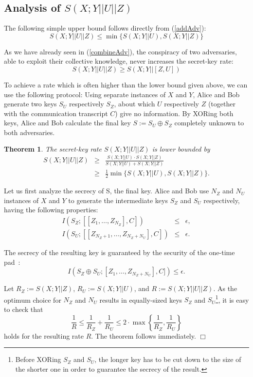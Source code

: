 \documentclass[a4paper, twoside, openany]{report}
\newcommand{\eps}{\epsilon}
\newcommand{\half}{\frac{1}{2}}
\theoremstyle{plain}
\newtheorem{theorem}{Theorem}
\theoremstyle{definition}
\newcommand{\proofend}{\hspace*{\fill} $\Box$\\}
\begin{document}
\subsection{Analysis of $S(X;Y||U||Z)$}

The following simple upper bound follows directly from (\ref{addAdv}):
\[S(X;Y||U||Z) \leq \min\{S(X;Y||U), S(X;Y||Z)\}\]

\noindent
As we have already seen in (\ref{combineAdv}), the conspiracy of two adversaries, able to exploit their collective knowledge, never increases the secret-key rate: 
\[S(X;Y||U||Z) \geq S(X;Y||[Z,U])\]

\noindent
To achieve a rate which is often higher than the lower bound given above, we can use the following protocol: Using separate instances of $X$ and $Y$, Alice and Bob generate two keys $S_U$ respectively $S_Z$, about which $U$ respectively $Z$ (together with the communication transcript $C$) give no information. By XORing both keys, Alice and Bob calculate the final key $S := S_U \oplus S_Z$ completely unknown to both adversaries.

\begin{theorem} \label{lbnd:XYwrtUandZbyXOR}
The secret-key rate $S(X;Y||U||Z)$ is lower bounded by
\begin{eqnarray*}
S(X;Y||U||Z) & \geq & \frac{S(X;Y||U) \cdot S(X;Y||Z)}{S(X;Y||U) + S(X;Y||Z)} \\
             & \geq & \half\min\{S(X;Y||U), S(X;Y||Z)\}.
\end{eqnarray*}
\end{theorem}

\proof
Let us first analyze the secrecy of S, the final key. Alice and Bob use $N_Z$ and $N_U$ instances of $X$ and $Y$ to generate the intermediate keys $S_Z$ and $S_U$ respectively, having the following properties:
\begin{eqnarray*}
I(S_Z;[[Z_1,\ldots,Z_{N_Z}],C])           & \leq & \eps, \\
I(S_U;[[Z_{N_Z+1},\ldots,Z_{N_Z+N_U}],C]) & \leq & \eps.
\end{eqnarray*}

\noindent
The secrecy of the resulting key is guaranteed by the security of the one-time pad~\cite{vernam26}:
\[I(S_Z \oplus S_U;[Z_1,\ldots,Z_{N_Z+N_U}],C]) \leq \eps.\]

\noindent
Let $R_Z := S(X;Y||Z)$, $R_U := S(X;Y||U)$, and $R := S(X;Y||U||Z)$. As the optimum choice for $N_Z$ and $N_U$ results in equally-sized keys $S_Z$ and $S_U$\footnote{Before XORing $S_Z$ and $S_U$, the longer key has to be cut down to the size of the shorter one in order to guarantee the secrecy of the result.}, it is easy to check that
\[\frac{1}{R} \leq \frac{1}{R_Z} + \frac{1}{R_U} \leq 2 \cdot \max\left\{\frac{1}{R_Z}, \frac{1}{R_U}\right\} \]
holds for the resulting rate $R$. The theorem follows immediately.
\proofend
\end{document}
